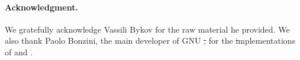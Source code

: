 \documentclass[a4paper,10pt,twoside]{book}
\begin{document}
\paragraph{Acknowledgment.}  We gratefully acknowledge Vassili Bykov for the raw material he provided. We also thank Paolo Bonzini, the main developer of GNU \st, for the \st implementations of  and .

\ifx\wholebook\relax\else
   
   
\end{document}
